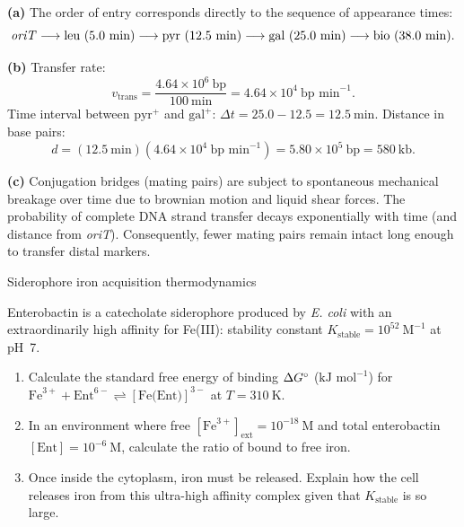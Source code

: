 \documentclass[12pt, a4paper, oneside]{report}
\begin{document}
\begin{solution}
  \textbf{(a)} The order of entry corresponds directly to the sequence of appearance times:
  \[
    \text{\textit{oriT}} \longrightarrow \text{leu}~(5.0~\text{min}) \longrightarrow \text{pyr}~(12.5~\text{min}) \longrightarrow \text{gal}~(25.0~\text{min}) \longrightarrow \text{bio}~(38.0~\text{min}).
  \]

  \textbf{(b)} Transfer rate:
  \[
    v_{\text{trans}} = \frac{4.64 \times 10^6~\text{bp}}{100~\text{min}} = 4.64 \times 10^4~\text{bp~min}^{-1}.
  \]
  Time interval between $\text{pyr}^+$ and $\text{gal}^+$: $\Delta t = 25.0 - 12.5 = 12.5~\text{min}$.
  Distance in base pairs:
  \[
    d = (12.5~\text{min})(4.64 \times 10^4~\text{bp~min}^{-1}) = 5.80 \times 10^5~\text{bp} = 580~\text{kb}.
  \]

  \textbf{(c)} Conjugation bridges (mating pairs) are subject to spontaneous mechanical breakage over time due to brownian motion and liquid shear forces. The probability of complete DNA strand transfer decays exponentially with time (and distance from \textit{oriT}). Consequently, fewer mating pairs remain intact long enough to transfer distal markers.
\end{solution}

\begin{problem}{\enspace{}\enspace
  Siderophore iron acquisition thermodynamics}

  Enterobactin is a catecholate siderophore produced by \textit{E. coli} with an extraordinarily high affinity for Fe(III): stability constant $K_{\text{stable}} = 10^{52}~\text{M}^{-1}$ at pH~7.

  \begin{enumerate}
    \item Calculate the standard free energy of binding $\Delta G^{\circ}$ ($\text{kJ~mol}^{-1}$) for $\text{Fe}^{3+} + \text{Ent}^{6-} \rightleftharpoons [\text{Fe(Ent)}]^{3-}$ at $T = 310~\text{K}$.
    \item In an environment where free $[\text{Fe}^{3+}]_{\text{ext}} = 10^{-18}~\text{M}$ and total enterobactin $[\text{Ent}] = 10^{-6}~\text{M}$, calculate the ratio of bound to free iron.
    \item Once inside the cytoplasm, iron must be released. Explain how the cell releases iron from this ultra-high affinity complex given that $K_{\text{stable}}$ is so large.
  \end{enumerate}
\end{problem}
\end{document}

